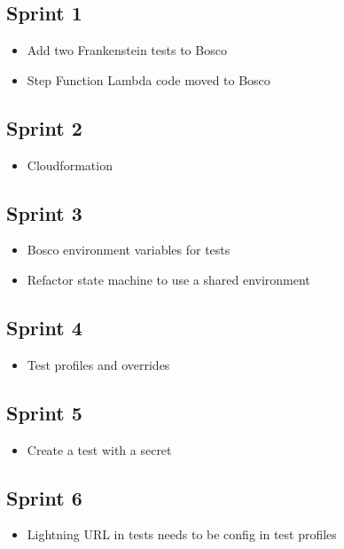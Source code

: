 \documentclass[12pt,a4paper,titlepage]{report}
\begin{document}
\subsection*{Sprint 1}
\begin{itemize}
\item Add two Frankenstein tests to Bosco
\item Step Function Lambda code moved to Bosco
\end{itemize}

\subsection*{Sprint 2}
\begin{itemize}
\item Cloudformation
\end{itemize}

\subsection*{Sprint 3}
\begin{itemize}
\item Bosco environment variables for tests
\item Refactor state machine to use a shared environment
\end{itemize}

\subsection*{Sprint 4}
\begin{itemize}
\item Test profiles and overrides
\end{itemize}

\subsection*{Sprint 5}
\begin{itemize}
\item Create a test with a secret
\end{itemize}

\subsection*{Sprint 6}
\begin{itemize}
\item Lightning URL in tests needs to be config in test profiles
\end{itemize}
\end{document}
